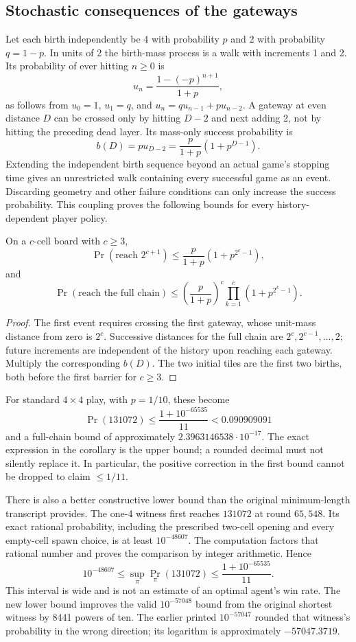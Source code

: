 \subsection{Stochastic consequences of the gateways}

Let each birth independently be 4 with probability $p$ and 2 with
probability $q=1-p$. In units of 2 the birth-mass process is a walk
with increments 1 and 2. Its probability of ever hitting $n\ge0$ is
\[
 u_n=\frac{1-(-p)^{n+1}}{1+p},
\]
as follows from $u_0=1$, $u_1=q$, and
$u_n=q u_{n-1}+p u_{n-2}$. A gateway at even distance $D$ can be
crossed only by hitting $D-2$ and next adding 2, not by hitting the
preceding dead layer. Its mass-only success probability is
\[
 b(D)=p u_{D-2}=\frac{p}{1+p}(1+p^{D-1}).
\]
Extending the independent birth sequence beyond an actual game's
stopping time gives an unrestricted walk containing every successful
game as an event. Discarding geometry and other failure conditions can
only increase the success probability. This coupling proves the
following bounds for every history-dependent player policy.

\begin{corollary}\label{cor:probabilitygates}
On a $c$-cell board with $c\ge3$,
\[
 \Pr(\text{reach }2^{c+1})
 \le\frac{p}{1+p}(1+p^{2^c-1}),
\]
and
\[
 \Pr(\text{reach the full chain})
 \le\left(\frac{p}{1+p}\right)^c
       \prod_{k=1}^c(1+p^{2^k-1}).
\]
\end{corollary}
\begin{proof}
The first event requires crossing the first gateway, whose unit-mass
distance from zero is $2^c$. Successive distances for the full chain
are $2^c,2^{c-1},\ldots,2$; future increments are independent of the
history upon reaching each gateway. Multiply the corresponding $b(D)$.
The two initial tiles are the first two births, both before the first
barrier for $c\ge3$.
\end{proof}

For standard $4\times4$ play, with $p=1/10$, these become
\[
 \Pr(131072)\le\frac{1+10^{-65535}}{11}<0.090909091
\]
and a full-chain bound of approximately $2.3963146538\cdot10^{-17}$.
The exact expression in the corollary is the upper bound; a rounded
decimal must not silently replace it. In particular, the positive
correction in the first bound cannot be dropped to claim $\le1/11$.

There is also a better constructive lower bound than the original
minimum-length transcript provides. The one-4 witness first
reaches $131072$ at round $65{,}548$. Its exact rational probability,
including the prescribed two-cell opening and every empty-cell spawn
choice, is at least $10^{-48607}$. The computation factors that rational
number and proves the comparison by integer arithmetic. Hence
\[
 10^{-48607}\le \sup_\pi\Pr_\pi(131072)
 \le\frac{1+10^{-65535}}{11}.
\]
This interval is wide and is not an estimate of an optimal agent's
win rate. The new lower bound improves the valid $10^{-57048}$ bound
from the original shortest witness by 8441 powers of ten. The earlier
printed $10^{-57047}$ rounded that witness's probability in the wrong
direction; its logarithm is approximately $-57047.3719$.

